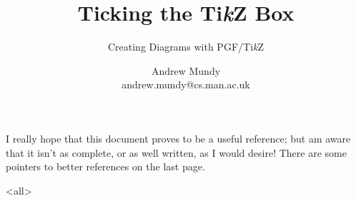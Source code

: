 \title{Ticking the Ti\emph{k}Z Box}
\subtitle{Creating Diagrams with PGF/Ti\emph{k}Z}
\author{Andrew Mundy\\andrew.mundy@cs.man.ac.uk}
\date{}

\usepackage{tikz}
\usetikzlibrary{automata,chains,scopes,patterns,petri}

\usepackage{etoolbox}

\usepackage{subcaption}

\lstset{
	frame = tb,
	columns = fullflexible,
}


	\maketitle
	\begin{frame}
		\titlepage
	\end{frame}

	I really hope that this document proves to be a useful reference; but am aware that it isn't as complete, or as well written, as I would desire!
	There are some pointers to better references on the last page.

	\mode<all>
		
		
		\appendix
		
	\mode*

